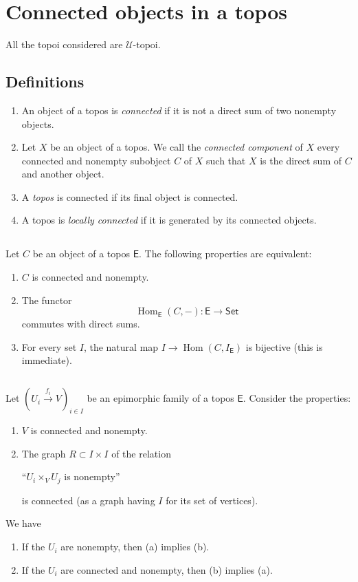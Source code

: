 \documentclass[10pt,oneside]{amsart}
\newcommand{\oldpage}[1]{\marginnote{\textbf{#1}}}
\newcommand{\cal}{\mathcal}
\newcommand{\cat}{\mathsf}
\newcommand{\Set}{\cat{Set}}
\DeclareMathOperator{\Hom}{Hom}
\begin{document}
\section{Connected objects in a topos}
\oldpage{1}
All the topoi considered are $\cal{U}$-topoi.

\subsection{Definitions}
\begin{enumerate}[label=(\alph*)]
  \item An object of a topos is \emph{connected} if it is not a direct sum of two nonempty objects.
  \item Let $X$ be an object of a topos.
    We call the \emph{connected component} of $X$ every connected and nonempty subobject $C$ of $X$ such that $X$ is the direct sum of $C$ and another object.
  \item A \emph{topos} is connected if its final object is connected.
  \item A topos is \emph{locally connected} if it is generated by its connected objects.
\end{enumerate}

\subsection{}
Let $C$ be an object of a topos $\cat{E}$.
The following properties are equivalent:
\begin{enumerate}[label=(\alph*)]
  \item $C$ is connected and nonempty.
  \item The functor
    \[
      \Hom_\cat{E}(C,-):\cat{E}\longrightarrow\Set
    \]
    commutes with direct sums.
  \item For every set $I$, the natural map $I\to\Hom(C,I_\cat{E})$ is bijective (this is immediate).
\end{enumerate}

\subsection{}
\oldpage{2}
Let $(U_i\xrightarrow{f_i}V)_{i\in I}$ be an epimorphic family of a topos $\cat{E}$.
Consider the properties:
\begin{enumerate}[label=(\alph*)]
  \item $V$ is connected and nonempty.
  \item The graph $R\subset I\times I$ of the relation
    \begin{center}
    ``$U_i\times_V U_j$ is nonempty''
    \end{center}
    is connected (as a graph having $I$ for its set of vertices).
\end{enumerate}
We have
\begin{enumerate}[label=(\roman*)]
  \item If the $U_i$ are nonempty, then (a) implies (b).
  \item If the $U_i$ are connected and nonempty, then (b) implies (a).
\end{enumerate}
\end{document}
